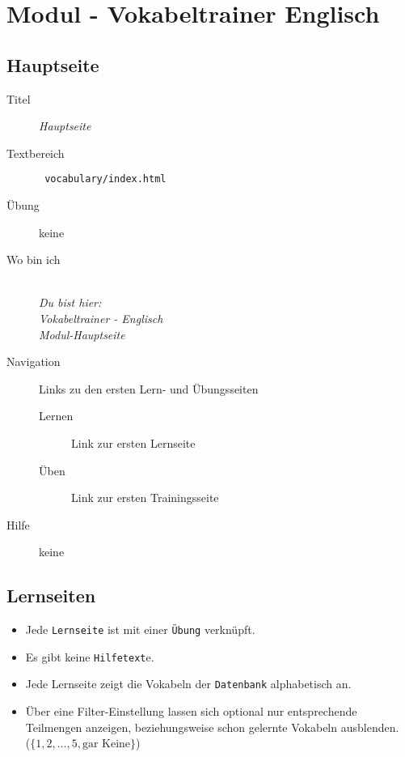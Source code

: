 \chapter{ Modul - Vokabeltrainer Englisch }
\label{has:voc-module}

\section{ Hauptseite }
\label{has:voc-module-mainpage}
\begin{description}
	\item[Titel] \emph{ Hauptseite }
	\item[Textbereich] \texttt{ vocabulary/index.html }
	\item[Übung] keine
	\item[Wo bin ich] \emph{\\Du bist hier:\\Vokabeltrainer - Englisch\\Modul-Hauptseite}
	\item[Navigation] Links zu den ersten Lern- und Übungsseiten
	\begin{description}
		\item[Lernen] Link zur ersten Lernseite 
		\item[Üben] Link zur ersten Trainingsseite 
	\end{description}
	\item[Hilfe] keine
\end{description}


\section{ Lernseiten }
\label{has:voc-learn}

\begin{itemize}
	\item Jede \texttt{Lernseite} ist mit einer \texttt{Übung} verknüpft.
	\item Es gibt keine \texttt{Hilfetext}e.
	\item Jede Lernseite zeigt die Vokabeln der \texttt{Datenbank} alphabetisch an.
	\item Über eine Filter-Einstellung  lassen sich optional nur entsprechende Teilmengen anzeigen, beziehungsweise schon gelernte Vokabeln ausblenden. \\
		($\{1, 2, \ldots, 5, \text{gar Keine}\}$)
\end{itemize}


